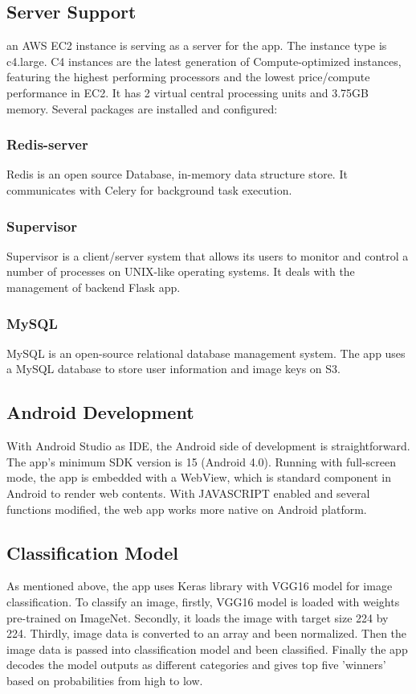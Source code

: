 \documentclass[conference]{IEEEtran}
\begin{document}
\subsection{Server Support}
an AWS EC2 instance is serving as a server for the app. The instance type is c4.large. C4 instances are the latest generation of Compute-optimized instances, featuring the highest performing processors and the lowest price/compute performance in EC2. It has 2 virtual central processing units and 3.75GB memory. Several packages are installed and configured:

\subsubsection{Redis-server}
Redis is an open source Database, in-memory data structure store. It communicates with Celery for background task execution.

\subsubsection{Supervisor}
Supervisor is a client/server system that allows its users to monitor and control a number of processes on UNIX-like operating systems. It deals with the management of backend Flask app.

\subsubsection{MySQL}
MySQL is an open-source relational database management system. The app uses a MySQL database to store user information and image keys on S3.

\subsection{Android Development}
With Android Studio as IDE, the Android side of development is straightforward. The app's minimum SDK version is 15 (Android 4.0). Running with full-screen mode, the app is embedded with a WebView, which is standard component in Android to render web contents. With JAVASCRIPT enabled and several functions modified, the web app works more native on Android platform.

\subsection{Classification Model}
As mentioned above, the app uses Keras library with VGG16 model for image classification. To classify an image, firstly, VGG16 model is loaded with weights pre-trained on ImageNet. Secondly, it loads the image with target size 224 by 224. Thirdly, image data is converted to an array and been normalized. Then the image data is passed into classification model and been classified. Finally the app decodes the model outputs as different categories and gives top five 'winners' based on probabilities from high to low.
\end{document}
